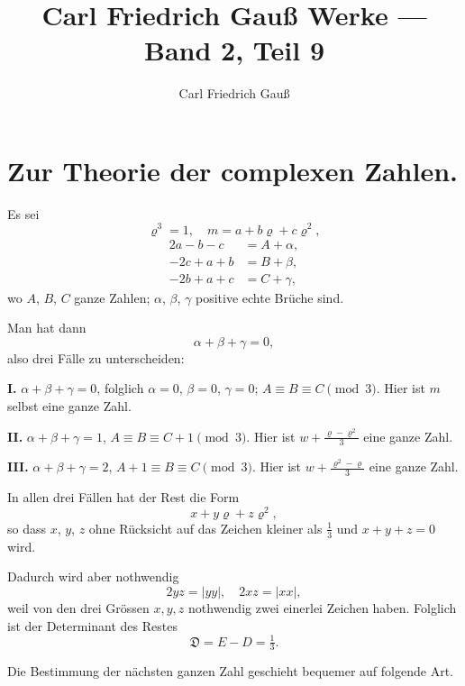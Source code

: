 \documentclass[10pt,a4paper]{article}
\title{Carl Friedrich Gau{\ss} Werke --- Band 2, Teil 9}
\author{Carl Friedrich Gau{\ss}}
\date{}
\begin{document}
\maketitle
\thispagestyle{empty}

\newpage
\setcounter{page}{391}

\section*{Zur Theorie der complexen Zahlen.}

Es sei
\[
\varrho^3 = 1, \quad m = a + b\varrho + c\varrho^2,
\]
\begin{align*}
2a - b - c &= A + \alpha, \\
-2c + a + b &= B + \beta, \\
-2b + a + c &= C + \gamma,
\end{align*}
wo $A$, $B$, $C$ ganze Zahlen; $\alpha$, $\beta$, $\gamma$ positive echte Brüche sind.

Man hat dann
\[
\alpha + \beta + \gamma = 0,
\]
also drei Fälle zu unterscheiden:

\medskip

\noindent\textbf{I.} $\alpha + \beta + \gamma = 0$, folglich $\alpha = 0$, $\beta = 0$, $\gamma = 0$; $A \equiv B \equiv C \pmod 3$. Hier ist $m$ selbst eine ganze Zahl.

\medskip

\noindent\textbf{II.} $\alpha + \beta + \gamma = 1$, $A \equiv B \equiv C + 1 \pmod 3$. Hier ist $w + \frac{\varrho - \varrho^2}{3}$ eine ganze Zahl.

\medskip

\noindent\textbf{III.} $\alpha + \beta + \gamma = 2$, $A + 1 \equiv B \equiv C \pmod 3$. Hier ist $w + \frac{\varrho^2 - \varrho}{3}$ eine ganze Zahl.

\medskip

In allen drei Fällen hat der Rest die Form
\[
x + y\varrho + z\varrho^2,
\]
so dass $x$, $y$, $z$ ohne Rücksicht auf das Zeichen kleiner als $\frac{1}{3}$ und $x + y + z = 0$ wird.

Dadurch wird aber nothwendig
\[
2yz = |yy|, \quad 2xz = |xx|,
\]
weil von den drei Grössen $x, y, z$ nothwendig zwei einerlei Zeichen haben. Folglich ist der Determinant des Restes
\[
\mathfrak{D} = E - D = \tfrac{1}{3}.
\]

Die Bestimmung der nächsten ganzen Zahl geschieht bequemer auf folgende Art.
\end{document}
